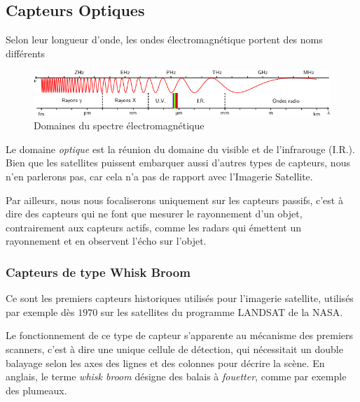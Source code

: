 \documentclass[a4paper, 10pt]{report}
\begin{document}
\subsection{Capteurs Optiques}
Selon leur longueur d'onde, les ondes électromagnétique portent des noms différents
\begin{figure}[H]
	\begin{center}
		\includegraphics[scale=0.5]{Images/Spectre_Electromagnetique.png}
		\caption{Domaines du spectre électromagnétique}
	\end{center}
\end{figure}
Le domaine \emph{optique} est la réunion du domaine du visible et de l'infrarouge (I.R.).
Bien que les satellites puissent embarquer aussi d'autres types de capteurs, nous n'en parlerons pas, car cela n'a pas de rapport avec l'Imagerie Satellite.

Par ailleurs, nous nous focaliserons uniquement sur les capteurs passifs, c'est à dire des capteurs qui ne font que mesurer le rayonnement d'un objet, contrairement aux capteurs actifs, comme les radars qui émettent un rayonnement et en observent l'écho sur l'objet.
\subsubsection{Capteurs de type Whisk Broom}
Ce sont les premiers capteurs historiques utilisés pour l'imagerie satellite, utilisés par exemple dès $1970$ sur les satellites du programme LANDSAT de la NASA.

Le fonctionnement de ce type de capteur s'apparente au mécanisme des premiers scanners, c'est à dire une unique cellule de détection, qui nécessitait un double balayage selon les axes des lignes et des colonnes pour décrire la scène.
En anglais, le terme \emph{whisk broom} désigne des balais à \emph{fouetter}, comme par exemple des plumeaux.
\end{document}
